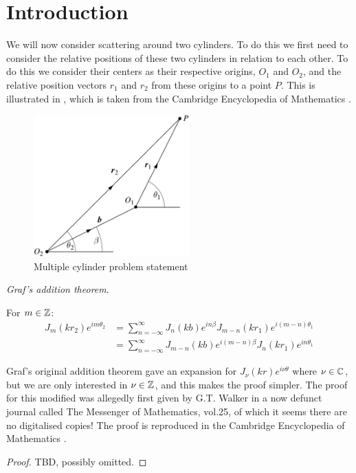 \section{Introduction}
We will now consider scattering around two cylinders. To do this we first need to consider the relative positions of these two cylinders in relation to each other. To do this we consider their centers as their respective origins, $O_1$ and $O_2$, and the relative position vectors $r_1$ and $r_2$ from these origins to a point $P$. This is illustrated in , which is taken from the Cambridge Encyclopedia of Mathematics \parencite{martin06scattering}. \par
%
  \begin{figure} \centering
    \includegraphics[width=6cm]{../figures/scattering_fig21.png}
    \caption{Multiple cylinder problem statement}\label{fig:problem_3}
  \end{figure}
%
  \begin{thm} \emph{Graf's addition theorem}. \par
    For $m \in \mathbb{Z}$:
      \begin{align*}
        J_m(kr_2)e^{im\theta_2} &= \sum^\infty_{n=-\infty} J_n (kb) e^{in\beta} J_{m-n} (kr_1) e^{i(m-n)\theta_1} \\
          & = \sum^\infty_{n=-\infty} J_{m-n} (kb) e^{i(m-n)\beta} J_n (kr_1) e^{in\theta_1}
        \end{align*}
  \end{thm}\par
%
Graf's original addition theorem gave an expansion for $J_\nu(kr)e^{i\nu\theta}$ where $\nu \in \mathbb{C}$, but we are only interested in $\nu \in \mathbb{Z}$, and this makes the proof simpler. The proof for this modified was allegedly first given by G.T. Walker in a now defunct journal called The Messenger of Mathematics, vol.25, of which it seems there are no digitalised copies! The proof is reproduced in the Cambridge Encyclopedia of Mathematics \parencite{martin06scattering}.
%
  \begin{proof} TBD, possibly omitted.
  \end{proof}
